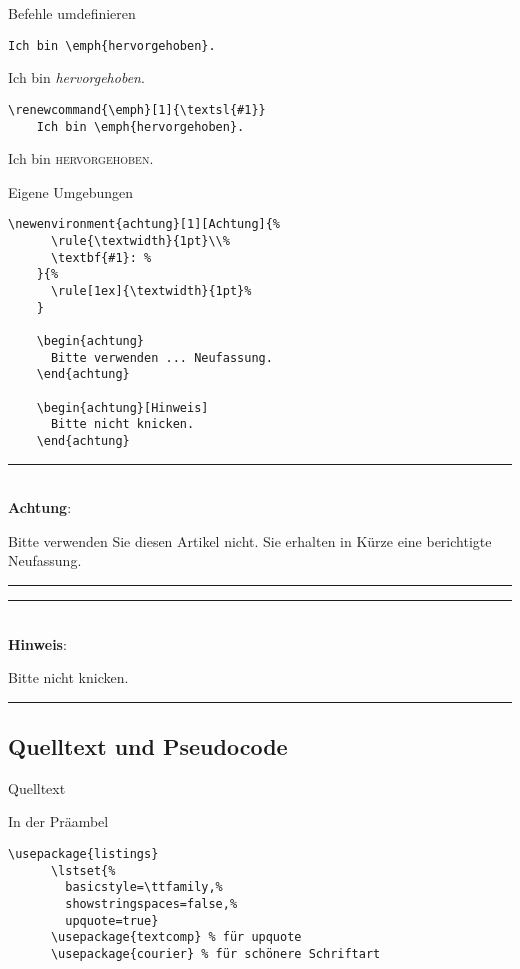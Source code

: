 \begin{Frame}[fragile]{Befehle umdefinieren}
  \begin{lstlisting}[gobble=4]
    Ich bin \emph{hervorgehoben}.
  \end{lstlisting}
  Ich bin \emph{hervorgehoben}.

  \xxx

  \begin{lstlisting}[gobble=4]
    \renewcommand{\emph}[1]{\textsl{#1}}
    Ich bin \emph{hervorgehoben}.
  \end{lstlisting}
  \renewcommand{\emph}[1]{\textsc{#1}}
  Ich bin \emph{hervorgehoben}.
\end{Frame}

\begin{Frame}[fragile]{Eigene Umgebungen}
  \begin{lstlisting}[gobble=4,morekeywords={[2]achtung}]
    \newenvironment{achtung}[1][Achtung]{%
      \rule{\textwidth}{1pt}\\%
      \textbf{#1}: %
    }{%
      \rule[1ex]{\textwidth}{1pt}%
    }

    \begin{achtung}
      Bitte verwenden ... Neufassung.
    \end{achtung}
  
    \begin{achtung}[Hinweis]
      Bitte nicht knicken.
    \end{achtung}
  \end{lstlisting}
  \newenvironment{achtung}[1][Achtung]{%
    \rule{\textwidth}{1pt}\\%
    \textbf{#1}: %
  }{%
    \rule[1ex]{\textwidth}{1pt}%
  }

  \begin{achtung}
    Bitte verwenden Sie diesen Artikel nicht.
    Sie erhalten in Kürze eine berichtigte Neufassung.
  \end{achtung}

  \begin{achtung}[Hinweis]
    Bitte nicht knicken.
  \end{achtung}
\end{Frame}

\subsection{Quelltext und Pseudocode}

\begin{Frame}[fragile]{Quelltext}
  \begin{Block}{In der Präambel}
    \begin{lstlisting}[style=block,gobble=6]
      \usepackage{listings}
      \lstset{%
        basicstyle=\ttfamily,%
        showstringspaces=false,%
        upquote=true}
      \usepackage{textcomp} % für upquote
      \usepackage{courier} % für schönere Schriftart
    \end{lstlisting}
  \end{Block}

  
  
\end{Frame}

